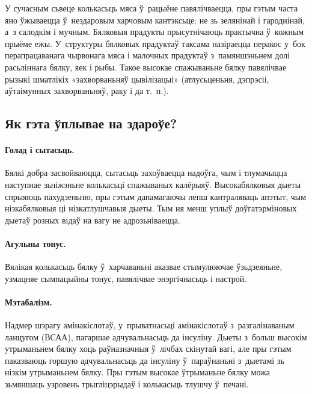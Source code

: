 
У сучасным сьвеце колькасьць мяса ў~рацыёне павялічваецца, пры гэтым часта яно ўжываецца ў~нездаровым харчовым кантэксьце: не зь зелянінай і гароднінай, а~з салодкім і мучным. Бялковыя прадукты прысутнічаюць практычна ў~кожным прыёме ежы. У~структуры бялковых прадуктаў таксама назіраецца перакос у~бок перапрацаванага чырвонага мяса і малочных прадуктаў з~памяншэньнем долі расьліннага бялку, яек і рыбы. Такое высокае спажываньне бялку павялічвае рызыкі шматлікіх «захворваньняў цывілізацыі» (атлусьценьня, дэпрэсіі, аўтаімунных захворваньняў, раку і да т.~п.).

\subsection{Як гэта ўплывае на здароўе?}

\paragraph{Голад і сытасьць.}
Бялкі добра засвойваюцца, сытасьць захоўваецца надоўга, чым і тлумачыцца наступнае зьніжэньне колькасьці спажываных калёрыяў. Высокабялковыя дыеты спрыяюць пахудзеньню, пры гэтым дапамагаючы лепш кантраляваць апэтыт, чым нізкабялковыя ці нізкатлушчавыя дыеты. Тым ня менш уплыў доўгатэрміновых дыетаў розных відаў на вагу не адрозьніваецца.

\paragraph{Агульны тонус.}
Вялікая колькасьць бялку ў~харчаваньні аказвае стымулюючае ўзьдзеяньне, узмацняе сымпацыйны тонус, павялічвае энэргічнасьць і настрой.

\paragraph{Мэтабалізм.}
Надмер шэрагу амінакіслотаў, у~прыватнасьці амінакіслотаў з~разгалінаваным ланцугом (ВСАА), пагаршае адчувальнасьць да інсуліну. Дыеты з~больш высокім утрыманьнем бялку хоць раўназначныя ў~лічбах скінутай вагі, але пры гэтым паказваюць горшую адчувальнасьць да інсуліну ў~параўнаньні з~дыетамі зь нізкім утрыманьнем бялку. Пры гэтым высокае ўтрыманьне бялку можа зьмяншаць узровень трыгліцэрыдаў і колькасьць тлушчу ў~печані.

